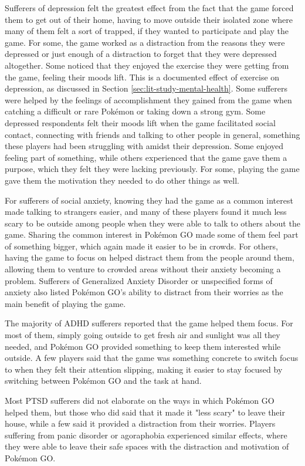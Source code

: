 Sufferers of depression felt the greatest effect from the fact that the game forced them to get out of their home, having to move outside their isolated zone where many of them felt a sort of trapped, if they wanted to participate and play the game. For some, the game worked as a distraction from the reasons they were depressed or just enough of a distraction to forget that they were depressed altogether. Some noticed that they enjoyed the exercise they were getting from the game, feeling their moods lift. This is a documented effect of exercise on depression, as discussed in Section \ref{sec:lit-study-mental-health}. Some sufferers were helped by the feelings of accomplishment they gained from the game when catching a difficult or rare Pokémon or taking down a strong gym. Some depressed respondents felt their moods lift when the game facilitated social contact, connecting with friends and talking to other people in general, something these players had been struggling with amidst their depression. Some enjoyed feeling part of something, while others experienced that the game gave them a purpose, which they felt they were lacking previously. For some, playing the game gave them the motivation they needed to do other things as well.

For sufferers of social anxiety, knowing they had the game as a common interest made talking to strangers easier, and many of these players found it much less scary to be outside among people when they were able to talk to others about the game. Sharing the common interest in Pokémon GO made some of them feel part of something bigger, which again made it easier to be in crowds. For others, having the game to focus on helped distract them from the people around them, allowing them to venture to crowded areas without their anxiety becoming a problem. Sufferers of Generalized Anxiety Disorder or unspecified forms of anxiety also listed Pokémon GO's ability to distract from their worries as the main benefit of playing the game.

The majority of ADHD sufferers reported that the game helped them focus. For most of them, simply going outside to get fresh air and sunlight was all they needed, and Pokémon GO provided something to keep them interested while outside. A few players said that the game was something concrete to switch focus to when they felt their attention slipping, making it easier to stay focused by switching between Pokémon GO and the task at hand.

Most PTSD sufferers did not elaborate on the ways in which Pokémon GO helped them, but those who did said that it made it "less scary" to leave their house, while a few said it provided a distraction from their worries. Players suffering from panic disorder or agoraphobia experienced similar effects, where they were able to leave their safe spaces with the distraction and motivation of Pokémon GO.

